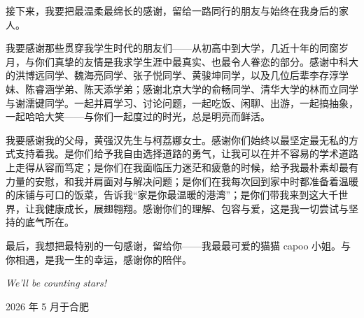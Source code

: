 接下来，我要把最温柔最绵长的感谢，留给一路同行的朋友与始终在我身后的家人。

我要感谢那些贯穿我学生时代的朋友们——从初高中到大学，几近十年的同窗岁月，与你们真挚的友情是我求学生涯中最真实、也最令人眷恋的部分。感谢中科大的洪博远同学、魏海亮同学、张子悦同学、黄骏坤同学，以及几位后辈李存淳学妹、陈睿涵学弟、陈天添学弟；感谢北京大学的俞畅同学、清华大学的林而立同学与谢濡键同学。一起并肩学习、讨论问题，一起吃饭、闲聊、出游，一起搞抽象，一起哈哈大笑——与你们一起度过的时光，总是明亮而鲜活。

我要感谢我的父母，黄强汉先生与柯荔娜女士。感谢你们始终以最坚定最无私的方式支持着我。是你们给予我自由选择道路的勇气，让我可以在并不容易的学术道路上走得从容而笃定；是你们在我面临压力迷茫和疲惫的时候，给予我最朴素却最有力量的安慰，和我并肩面对与解决问题；是你们在我每次回到家中时都准备着温暖的床铺与可口的饭菜，告诉我“家是你最温暖的港湾”；是你们带我来到这大千世界，让我健康成长，展翅翱翔。感谢你们的理解、包容与爱，这是我一切尝试与坚持的底气所在。

最后，我想把最特别的一句感谢，留给你——我最最可爱的猫猫 capoo 小姐。与你相遇，是我一生的幸运，感谢你的陪伴。


\centering \textit{We'll be counting stars!}

\medskip

\hfill{2026 年 5 月于合肥}